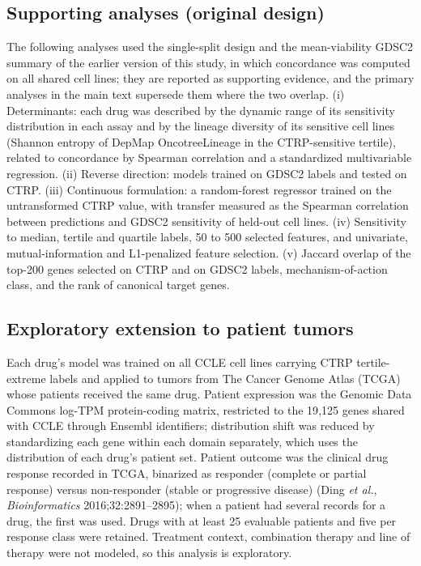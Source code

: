 \subsection*{Supporting analyses (original design)}
The following analyses used the single-split design and the mean-viability GDSC2
summary of the earlier version of this study, in which concordance was computed on
all shared cell lines; they are reported as supporting evidence, and the primary
analyses in the main text supersede them where the two overlap. (i) Determinants: each drug
was described by the dynamic range of its sensitivity distribution in each assay
and by the lineage diversity of its sensitive cell lines (Shannon entropy of DepMap
OncotreeLineage in the CTRP-sensitive tertile), related to concordance by Spearman
correlation and a standardized multivariable regression. (ii) Reverse direction:
models trained on GDSC2 labels and tested on CTRP. (iii) Continuous formulation: a
random-forest regressor trained on the untransformed CTRP value, with transfer
measured as the Spearman correlation between predictions and GDSC2 sensitivity of
held-out cell lines. (iv) Sensitivity to median, tertile and quartile labels, 50 to
500 selected features, and univariate, mutual-information and L1-penalized feature
selection. (v) Jaccard overlap of the top-200 genes selected on CTRP and on GDSC2
labels, mechanism-of-action class, and the rank of canonical target genes.

\subsection*{Exploratory extension to patient tumors}
Each drug's model was trained on all CCLE cell lines carrying CTRP tertile-extreme
labels and applied to tumors from The Cancer Genome Atlas (TCGA) whose patients
received the same drug. Patient expression was the Genomic Data Commons log-TPM
protein-coding matrix, restricted to the 19{,}125 genes shared with CCLE through
Ensembl identifiers; distribution shift was reduced by standardizing each gene
within each domain separately, which uses the distribution of each drug's patient
set. Patient outcome was the clinical drug response recorded in TCGA, binarized as
responder (complete or partial response) versus non-responder (stable or
progressive disease) (Ding \emph{et al.}, \emph{Bioinformatics} 2016;32:2891--2895); when a patient had several records
for a drug, the first was used. Drugs with at least 25 evaluable patients and five
per response class were retained. Treatment context, combination therapy and line
of therapy were not modeled, so this analysis is exploratory.

